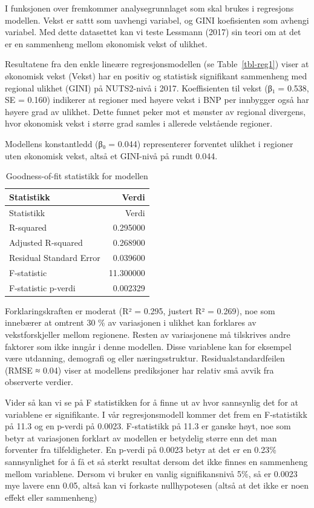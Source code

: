 \documentclass[
  letterpaper,
  DIV=11,
  numbers=noendperiod]{scrartcl}
\begin{document}
I funksjonen over fremkommer analysegrunnlaget som skal brukes i
regresjons modellen. Vekst er sattt som uavhengi variabel, og GINI
koefisienten som avhengi variabel. Med dette datasettet kan vi teste
Lessmann (2017) sin teori om at det er en sammenheng mellom økonomisk
vekst of ulikhet.

Resultatene fra den enkle lineære regresjonsmodellen (se
Table~\ref{tbl-reg1}) viser at økonomisk vekst (Vekst) har en positiv og
statistisk signifikant sammenheng med regional ulikhet (GINI) på
NUTS2-nivå i 2017. Koeffisienten til vekst (β₁ = 0.538, SE = 0.160)
indikerer at regioner med høyere vekst i BNP per innbygger også har
høyere grad av ulikhet. Dette funnet peker mot et mønster av regional
divergens, hvor økonomisk vekst i større grad samles i allerede
velstående regioner.

Modellens konstantledd (β₀ = 0.044) representerer forventet ulikhet i
regioner uten økonomisk vekst, altså et GINI-nivå på rundt 0.044.

\begin{longtable}[]{@{}lr@{}}
\caption{Goodness-of-fit statistikk for modellen}\tabularnewline
\toprule\noalign{}
Statistikk & Verdi \\
\midrule\noalign{}
\endfirsthead
\toprule\noalign{}
Statistikk & Verdi \\
\midrule\noalign{}
\endhead
\bottomrule\noalign{}
\endlastfoot
R-squared & 0.295000 \\
Adjusted R-squared & 0.268900 \\
Residual Standard Error & 0.039600 \\
F-statistic & 11.300000 \\
F-statistic p-verdi & 0.002329 \\
\end{longtable}

Forklaringskraften er moderat (R² = 0.295, justert R² = 0.269), noe som
innebærer at omtrent 30 \% av variasjonen i ulikhet kan forklares av
vekstforskjeller mellom regionene. Resten av variasjonene må tilskrives
andre faktorer som ikke inngår i denne modellen. Disse variablene kan
for eksempel være utdanning, demografi og eller næringsstruktur.
Residualstandardfeilen (RMSE ≈ 0.04) viser at modellens prediksjoner har
relativ små avvik fra observerte verdier.

Vider så kan vi se på F statistikken for å finne ut av hvor sannsynlig
det for at variablene er signifikante. I vår regresjonsmodell kommer det
frem en F-statistikk på 11.3 og en p-verdi på 0.0023. F-statistikk på
11.3 er ganske høyt, noe som betyr at variasjonen forklart av modellen
er betydelig større enn det man forventer fra tilfeldigheter. En p-verdi
på 0.0023 betyr at det er en 0.23\% sannsynlighet for å få et så sterkt
resultat dersom det ikke finnes en sammenheng mellom variablene. Dersom
vi bruker en vanlig signifikansnivå 5\%, så er 0.0023 mye lavere enn
0.05, altså kan vi forkaste nullhypotesen (altså at det ikke er noen
effekt eller sammenheng)
\end{document}
